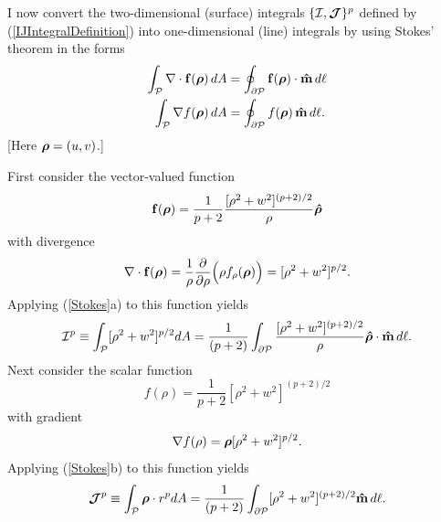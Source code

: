\documentclass[letterpaper]{article}
\newcommand{\vbhatt}[1]{\boldsymbol{\hat #1}}
\begin{document}
I now convert the two-dimensional (surface) integrals 
$\{\mathcal{I}, \boldsymbol{\mathcal{J}}\}^p$ defined by (\ref{IJIntegralDefinition})
into one-dimensional (line) integrals by using Stokes' theorem in the forms
\begin{subequations}
\begin{align}
 \int_{\mathcal{P}} \nabla \cdot \mathbf{f}(\boldsymbol{\rho})\,dA
 &=
 \oint_{\partial \mathcal{P}} \mathbf{f}(\boldsymbol{\rho}) \cdot \mathbf{\hat m} \, d\ell
\\
 \int_{\mathcal{P}} \nabla f(\boldsymbol{\rho})\,dA
 &=
 \oint_{\partial \mathcal{P}} f(\boldsymbol{\rho}) \, \mathbf{\hat m} \, d\ell.
\end{align}
\label{Stokes}
\end{subequations}
[Here $\boldsymbol{\rho}=(u,v)$.]

First consider the vector-valued function
$$ \vb f(\vbrho)=
   \frac{1}{p+2}
   \frac{ [\rho^2 + w^2]^{(p+2)/2}}{\rho}\vbhatt{\rho} $$
with divergence
$$
   \nabla \cdot \mathbf{f}(\boldsymbol{\rho})=
   \frac{1}{\rho}\frac{\partial }{\partial \rho}\Big(\rho f_\rho(\boldsymbol{\rho}) \Big)
   = [\rho^2 + w^2]^{p/2}.
$$
Applying (\ref{Stokes}a) to this function yields
$$\mathcal{I}^p
  \equiv \int_{\mc P} [\rho^2 + w^2]^{p/2} dA
  =\frac{1}{(p+2)}\int_{\partial \mc P} 
   \frac{ [\rho^2 + w^2]^{(p+2)/2} } { \rho } 
   \vbhatt{\rho}\cdot\vbhat{m} \, d\ell.
$$
Next consider the scalar function 
$$ f(\rho) = \frac{1}{p+2} [\rho^2 + w^2]^{ (p+2)/2} $$
with gradient
$$ \nabla f(\rho) = \boldsymbol{\rho} [\rho^2 + w^2]^{p/2}.$$
Applying (\ref{Stokes}b) to this function yields
$$\boldsymbol{\mathcal{J}}^p
  \equiv  \int_{\mathcal{P}} \boldsymbol{\rho} \cdot r^p dA
  =\frac{1}{(p+2)}\int_{\partial \mathcal{P}}
   [\rho^2 + w^2]^{(p+2)/2}  \mathbf{\hat m} \, d\ell.
$$

\end{document}
